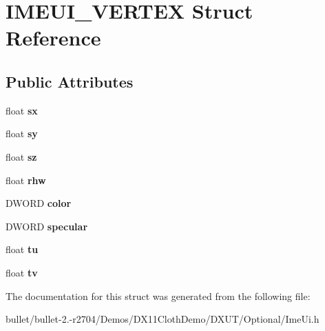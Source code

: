 \hypertarget{struct_i_m_e_u_i___v_e_r_t_e_x}{\section{I\+M\+E\+U\+I\+\_\+\+V\+E\+R\+T\+E\+X Struct Reference}
\label{struct_i_m_e_u_i___v_e_r_t_e_x}
}
\subsection*{Public Attributes}
\begin{DoxyCompactItemize}
\item 
\hypertarget{struct_i_m_e_u_i___v_e_r_t_e_x_a72e28d18dc70f0dac806f2109c5cb602}{float {\bfseries sx}}\label{struct_i_m_e_u_i___v_e_r_t_e_x_a72e28d18dc70f0dac806f2109c5cb602}

\item 
\hypertarget{struct_i_m_e_u_i___v_e_r_t_e_x_a52de2ad1a8bd5b932a75375e6c39d03e}{float {\bfseries sy}}\label{struct_i_m_e_u_i___v_e_r_t_e_x_a52de2ad1a8bd5b932a75375e6c39d03e}

\item 
\hypertarget{struct_i_m_e_u_i___v_e_r_t_e_x_a2f6ece7d0e2281d5039d92acae5dc0b8}{float {\bfseries sz}}\label{struct_i_m_e_u_i___v_e_r_t_e_x_a2f6ece7d0e2281d5039d92acae5dc0b8}

\item 
\hypertarget{struct_i_m_e_u_i___v_e_r_t_e_x_a8429bfb4cedca08f71fa07cf038446f7}{float {\bfseries rhw}}\label{struct_i_m_e_u_i___v_e_r_t_e_x_a8429bfb4cedca08f71fa07cf038446f7}

\item 
\hypertarget{struct_i_m_e_u_i___v_e_r_t_e_x_affcfaa89e1df321006c2c1bc3872ace1}{D\+W\+O\+R\+D {\bfseries color}}\label{struct_i_m_e_u_i___v_e_r_t_e_x_affcfaa89e1df321006c2c1bc3872ace1}

\item 
\hypertarget{struct_i_m_e_u_i___v_e_r_t_e_x_ad15a16dc6fd97b49c73b0dbdd860d765}{D\+W\+O\+R\+D {\bfseries specular}}\label{struct_i_m_e_u_i___v_e_r_t_e_x_ad15a16dc6fd97b49c73b0dbdd860d765}

\item 
\hypertarget{struct_i_m_e_u_i___v_e_r_t_e_x_ab1c33ee196f2b5875008f51e729e431c}{float {\bfseries tu}}\label{struct_i_m_e_u_i___v_e_r_t_e_x_ab1c33ee196f2b5875008f51e729e431c}

\item 
\hypertarget{struct_i_m_e_u_i___v_e_r_t_e_x_a3568a33cf83721ce8790ef2a91dfe552}{float {\bfseries tv}}\label{struct_i_m_e_u_i___v_e_r_t_e_x_a3568a33cf83721ce8790ef2a91dfe552}

\end{DoxyCompactItemize}


The documentation for this struct was generated from the following file\+:\begin{DoxyCompactItemize}
\item 
bullet/bullet-\/2.-\/r2704/\+Demos/\+D\+X11\+Cloth\+Demo/\+D\+X\+U\+T/\+Optional/Ime\+Ui.\+h\end{DoxyCompactItemize}
